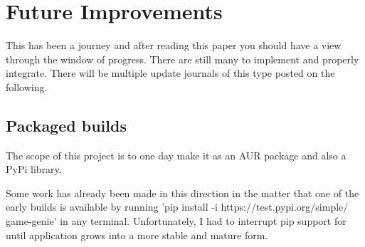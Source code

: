 


\chapter*{Future Improvements}
  This has been a journey and after reading this paper you should have a view through the window of progress. There are still many to implement and properly integrate. There will be multiple update journals of this type posted on the following.

\section*{Packaged builds}
  The scope of this project is to one day make it as an AUR package and also a PyPi library.

  Some work has already been made in this direction in the matter that one of the early builds is available by running 'pip install -i https://test.pypi.org/simple/ game-genie' in any terminal.
  Unfortunately, I had to interrupt pip support for until application grows into a more stable and mature form.
